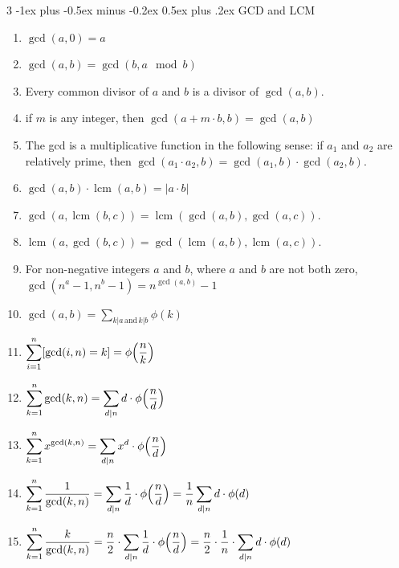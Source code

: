 \documentclass[8pt,a4paper,onesided]{article}
\makeatletter
\renewcommand{\subsection}{\@startsection{subsection}{2}{0mm}
    {-1ex plus -0.5ex minus -0.2ex} %
    {0.5ex plus .2ex}                %
    {\normalfont\large\bfseries}}    %
\makeatother
\begin{document}
\begin{multicols}{3}
\subsection{GCD and LCM}
\begin{enumerate}[resume]
    \item $\displaystyle \gcd(a, 0) = a$
    \item $\displaystyle \gcd(a, b) = \gcd(b, a \mod b)$
    \item Every common divisor of $\displaystyle a$ and $b$ is a divisor of $\displaystyle \gcd(a,b)$.
    \item if $m$ is any integer, then $\displaystyle \gcd(a + m {\cdot} b, b) = \gcd(a, b)$
    \item The gcd is a multiplicative function in the following sense: if $\displaystyle a_1$ and $\displaystyle a_2$ are relatively prime, then $\displaystyle \gcd(a_1 \cdot a_2, b) = \gcd(a_1, b) \cdot \gcd(a_2,b )$.
    \item $\displaystyle \gcd(a, b){\cdot} \operatorname{lcm}(a, b) = |a{\cdot}b|$
    \item $\displaystyle \gcd(a, \operatorname{lcm}(b, c)) = \operatorname{lcm}(\gcd(a, b), \gcd(a, c))$.
    \item $\displaystyle \operatorname{lcm}(a, \gcd(b, c)) = \gcd(\operatorname{lcm}(a, b), \operatorname{lcm}(a, c))$.
    \item For non-negative integers $\displaystyle a$ and $b$, where $\displaystyle a$ and $b$ are not both zero, $\displaystyle \gcd({n^a} - 1, {n^b} - 1) = n^{\gcd(a,b)} - 1$
    \item $\displaystyle \gcd(a, b) = \displaystyle \sum_{k|a \, \text{and} \, k|b} {\phi(k)}$
    \item $\displaystyle \displaystyle \sum_{i=1}^n [\gcd(i, n) = k] = { \phi{\left(\frac{n}{k}\right)}}$
    \item $\displaystyle \displaystyle \sum_{k=1}^n \gcd(k, n) = \displaystyle \sum_{d|n} d \cdot {\phi{\left(\frac{n}{d}\right)}}$
    \item $\displaystyle \displaystyle \sum_{k=1}^n x^{\gcd(k,n)} = \displaystyle \sum_{d|n} x^d \cdot {\phi{\left(\frac{n}{d}\right)}}$
    \item $\displaystyle \displaystyle \sum_{k=1}^n \frac{1}{\gcd(k, n)} = \displaystyle \sum_{d|n} \frac{1}{d} \cdot {\phi{\left(\frac{n}{d}\right)}} = \frac{1}{n} \displaystyle \sum_{d|n} d \cdot \phi(d)$
    \item $\displaystyle \displaystyle \sum_{k=1}^n \frac{k}{\gcd(k, n)} = \frac{n}{2} \cdot \displaystyle \sum_{d|n} \frac{1}{d} \cdot {\phi{\left(\frac{n}{d}\right)}} = \frac{n}{2} \cdot \frac{1}{n} \cdot \displaystyle \sum_{d|n} d \cdot \phi(d)$

\end{enumerate}
\end{multicols}
\end{document}
